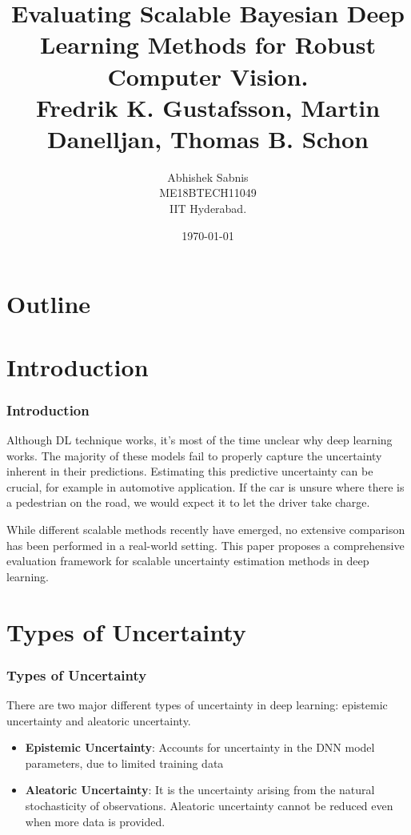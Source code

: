 \documentclass{beamer}
\title{Evaluating Scalable Bayesian Deep Learning
Methods for Robust Computer Vision. \\ Fredrik K. Gustafsson, Martin Danelljan, Thomas B. Schon}
\author{ Abhishek Sabnis \\ ME18BTECH11049 \\IIT Hyderabad.}
\date{\today}
\begin{document}
\begin{frame}
\titlepage
\end{frame}

\section*{Outline}
\begin{frame}
\tableofcontents
\end{frame}
\section{Introduction}

\begin{frame}
\frametitle{Introduction}
%
    \hspace{0.3cm} Although DL technique works, it’s most of the time unclear why deep learning works. The majority of these models fail to properly capture the uncertainty inherent in their predictions. Estimating this predictive uncertainty can be crucial, for example in automotive application. If the car is unsure where there is a pedestrian on the road, we would expect it to let the driver take charge. 
    
    \vspace{0.3cm}
    
    \hspace{0.3cm} While different scalable methods recently have emerged, no extensive comparison has been performed in a real-world setting. This paper proposes a comprehensive evaluation framework for scalable  uncertainty estimation methods in deep learning.
%

\end{frame}


\section{Types of Uncertainty}
\begin{frame}
\frametitle{Types of Uncertainty}

There are two major different types of uncertainty in deep learning: epistemic uncertainty and aleatoric uncertainty. 

\vspace{0.3cm}

\begin{itemize}
  \item \textbf{Epistemic Uncertainty}: Accounts for uncertainty in the DNN
model parameters, due to limited training data

  \item \textbf{Aleatoric Uncertainty}: It is the uncertainty arising from the natural stochasticity of observations. Aleatoric uncertainty cannot be reduced even when more data is provided. 
\end{itemize}

\end{frame}
\end{document}
